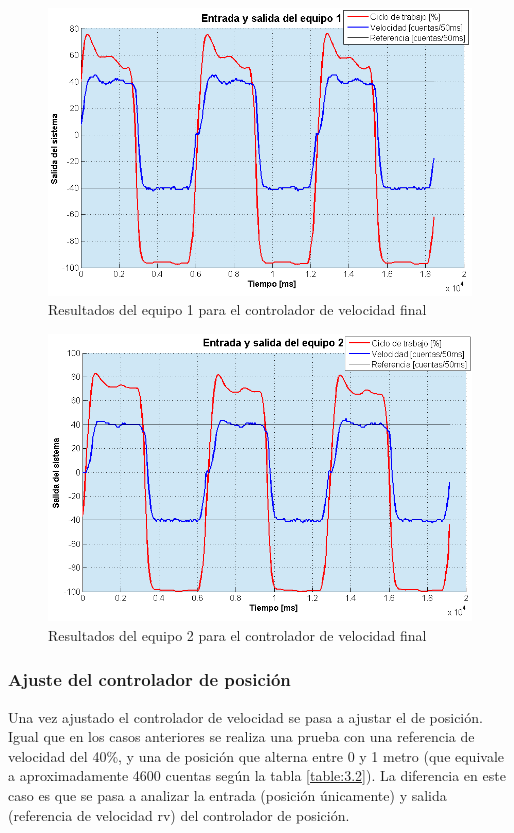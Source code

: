 \begin{figure}[!ht]
	\centering
	\includegraphics[width=15cm,scale=1]{resources/3_20-esquemaControl2E1.png}
	\caption{Resultados del equipo 1 para el controlador de velocidad final}
	\label{fig:\thefigure}
\end{figure}

\begin{figure}[!ht]
	\centering
	\includegraphics[width=15cm,scale=1]{resources/3_21-esquemaControl2E2.png}
	\caption{Resultados del equipo 2 para el controlador de velocidad final}
	\label{fig:\thefigure}
\end{figure}


\subsubsection{Ajuste del controlador de posición}
Una vez ajustado el controlador de velocidad se pasa a ajustar el de posición. Igual que en los casos anteriores se realiza una prueba con una referencia de velocidad del 40\%, y una de posición que alterna entre 0 y 1 metro (que equivale a aproximadamente 4600 cuentas según la tabla \ref{table:3.2}). La diferencia en este caso es que se pasa a analizar la entrada (posición únicamente) y salida (referencia de velocidad rv) del controlador de posición.


